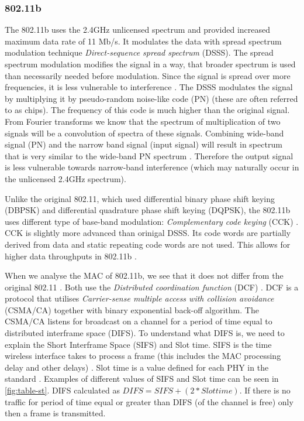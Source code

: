 \subsubsection{802.11b} \label{802.11b}
% 
The 802.11b uses the 2.4GHz unlicensed spectrum and provided increased maximum data rate of 11 Mb/s. It  modulates the data with spread spectrum modulation technique \emph{Direct-sequence spread spectrum} (DSSS). The spread spectrum modulation modifies the signal in a way, that broader spectrum is used than necessarily needed before modulation. Since the signal is spread over more frequencies, it is less vulnerable to interference \cite{MaximIntegratedProductsInc.2013AnMaxim}. The DSSS modulates the signal by multiplying it by pseudo-random  noise-like code (PN) (these are often referred to as chips). The frequency of this code is much higher than the original signal. From Fourier transforms we know that the spectrum of multiplication of two signals will be a convolution of spectra of these signals. Combining wide-band signal (PN) and the narrow band signal (input signal) will result in spectrum that is very similar to the wide-band PN spectrum \cite{Haykin2001CommunicationSystems}. Therefore the output signal is less vulnerable towards narrow-band interference (which may naturally occur in the unlicensed 2.4GHz spectrum).\par
% 
Unlike the original 802.11, which used differential binary phase shift keying (DBPSK) and differential quadrature phase shift keying (DQPSK), the 802.11b uses different type of base-band modulation: \emph{Complementary code keying} (CCK) \cite{2016IEEEAccess.} \cite{Aboul-Magd2008WirelessPerspective}.
CCK is slightly more advanced than orinigal DSSS. Its code words are partially derived from data and static repeating code words are not used. This allows for higher data throughputs in 802.11b \cite{Gast2002802.11Guide}.\par
% 
When we analyse the MAC of 802.11b, we see that it does not differ from the original 802.11 \cite{Gast2002802.11Guide}. Both use the \emph{Distributed coordination function} (DCF) \cite{Hiertz2010TheUniverse}. DCF is a protocol that utilises \emph{Carrier-sense multiple access with collision avoidance} (CSMA/CA) together with binary exponential back-off algorithm. The CSMA/CA listens for broadcast on a channel for a period of time equal to distributed interframe space (DIFS). To understand what DIFS is, we need to explain the Short Interframe Space (SIFS) and Slot time. SIFS is the time wireless interface takes to process a frame (this includes the MAC processing delay and other delays) \cite{2016IEEEAccess.}. Slot time is a value defined for each PHY in the standard \cite{2016IEEEAccess.}. Examples of different values of SIFS and Slot time can be seen in \ref{fig:table-st}. DIFS calculated as \(DIFS = SIFS + ( 2 * Slot time)\). If there is no traffic for period of time equal or greater than DIFS (of the channel is free) only then a frame is transmitted.\par
